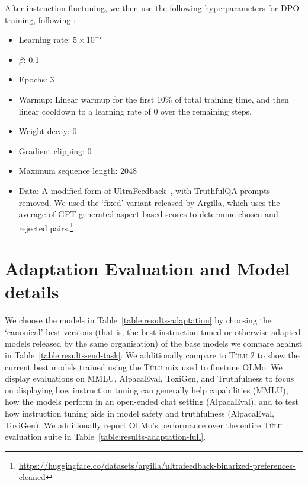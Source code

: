 \documentclass[11pt]{article}
\newcommand{\olmo}{OLMo\xspace}
\newcommand{\tulu}{\textsc{T\"ulu}\xspace}
\begin{document}
After instruction finetuning, we then use the following hyperparameters for DPO training, following \citet{ivison2023camels}:

\begin{itemize}
\setlength{\itemsep}{0pt}
    \item Learning rate: $5 \times 10^{-7}$
    \item $\beta$: 0.1
    \item Epochs: 3
    \item Warmup: Linear warmup for the first 10\% of total training time, and then linear cooldown to a learning rate of 0 over the remaining steps.
    \item Weight decay: 0
    \item Gradient clipping: 0
    \item Maximum sequence length: 2048
    \item Data: A modified form of UltraFeedback~\citep{cui2023ultrafeedback}, with TruthfulQA prompts removed. We used the `fixed' variant released by Argilla, which uses the average of GPT-generated aspect-based scores to determine chosen and rejected pairs.\footnote{\url{https://huggingface.co/datasets/argilla/ultrafeedback-binarized-preferences-cleaned}}
\end{itemize}

\section{Adaptation Evaluation and Model details}
\label{app:adaptation-evals-description}
We choose the models in Table~\ref{table:results-adaptation} by choosing the `canonical' best versions (that is, the best instruction-tuned or otherwise adapted models released by the same organisation) of the base models we compare against in Table~\ref{table:results-end-task}. We additionally compare to \tulu 2 to show the current best models trained using the \tulu mix used to finetune \olmo. We display evaluations on MMLU, AlpacaEval, ToxiGen, and Truthfulness to focus on displaying how instruction tuning can generally help capabilities (MMLU), how the models perform in an open-ended chat setting (AlpacaEval), and to test how instruction tuning aids in model safety and truthfulness (AlpacaEval, ToxiGen). We additionally report \olmo's performance over the entire \tulu evaluation suite in Table~\ref{table:results-adaptation-full}.
\end{document}
